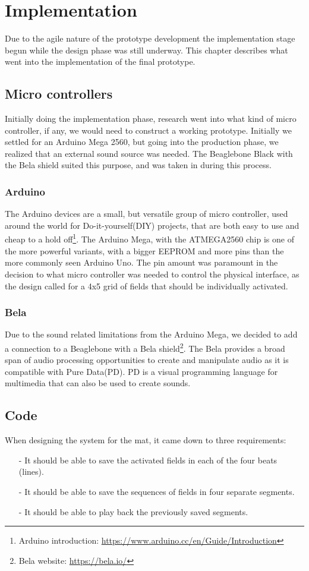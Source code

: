 \chapter{Implementation}\label{imp}
Due to the agile nature of the prototype development the implementation stage begun while the design phase was still underway. This chapter describes what went into the implementation of the final prototype.

\section{Micro controllers}%
	Initially doing the implementation phase, research went into what kind of micro controller, if any, we would need to construct a working prototype. Initially we settled for an Arduino Mega 2560, but going into the production phase, we realized that an external sound source was needed. The Beaglebone Black with the Bela shield suited this purpose, and was taken in during this process.
	\subsection{Arduino}%
		The Arduino devices are a small, but versatile group of micro controller, used around the world for Do-it-yourself(DIY) projects, that are both easy to use and cheap to a hold off\footnote{Arduino introduction: \url{https://www.arduino.cc/en/Guide/Introduction}}. The Arduino Mega, with the ATMEGA2560 chip is one of the more powerful variants, with a bigger EEPROM and more pins than the more commonly seen Arduino Uno. The pin amount was paramount in the decision to what micro controller was needed to control the physical interface, as the design called for a 4x5 grid of fields that should be individually activated. 
		
	\subsection{Bela}%
		Due to the sound related limitations from the Arduino Mega, we decided to add a connection to a Beaglebone with a Bela shield\footnote{Bela website: \url{https://bela.io/}}. The Bela provides a broad span of audio processing opportunities to create and manipulate audio as it is compatible with Pure Data(PD). PD is a visual programming language for multimedia that can also be used to create sounds.
	
\section{Code}
	When designing the system for the mat, it came down to three requirements:
	\begin{itemize}
		\item[-] It should be able to save the activated fields in each of the four beats (lines).
		\item[-] It should be able to save the sequences of fields in four separate segments.
		\item[-] It should be able to play back the previously saved segments.
	\end{itemize}
